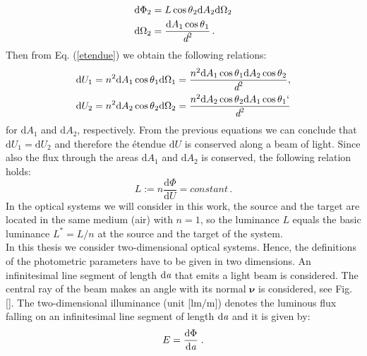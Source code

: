 \begin{equation}\begin{split}
\textrm{d}\Phi_2 &= L \cos\mbox{$\theta$}_2 \textrm{d}A_2 \textrm{d}\Omega_2\\
\textrm{d}\Omega_2 &= \frac{\textrm{d}A_1\cos\mbox{$\theta$}_1}{\textit{d}^2}\,.
\end{split}
\end{equation}
Then from Eq. (\ref{etendue}) we obtain the following relations: \begin{equation}
\begin{split}
\textrm{d}U_1 &= n^2 \textrm{d}A_1\cos\mbox{$\theta$}_1\textrm{d}\Omega_1= \frac{n^2 \textrm{d}A_1\cos\mbox{$\theta$}_1\textrm{d}A_2\cos\mbox{$\theta$}_2}{\textit{d}^2},\\
\textrm{d}U_2 &= n^2 \textrm{d}A_2\cos\mbox{$\theta$}_2\textrm{d}\Omega_2= \frac{ n^2 \textrm{d}A_2\cos\mbox{$\theta$}_2\textrm{d}A_1\cos\mbox{$\theta$}_1	`}{\textit{d}^2}
\end{split}
\end{equation}
for $\textrm{d}A_1$ and $\textrm{d}A_2$, respectively.
From the previous equations we can conclude that $\textrm{d}U_1=\textrm{d}U_2$ and therefore the \'{e}tendue $\textrm{d}U$ is conserved along a beam of light. 
Since also the flux through the areas $\textrm{d}A_1$ and $\textrm{d}A_2$ is conserved, the following relation holds:
\begin{equation}\label{basicluminance}
L := n \frac{\textrm{d}\Phi}{\textrm{d}U} = constant\,.
\end{equation}
 In the optical systems we will consider in this work, the source and the target are located in the same medium (air) with $n=1$, so the luminance $L$ equals the basic luminance $L^* = L/n$ at the source and the target of the system.\\
\indent In this thesis we consider two-dimensional optical systems. 
 Hence, the definitions of the photometric parameters have to be given in two dimensions. An infinitesimal line segment of length $\textrm{d}\textit{a}$ that emits a light beam is considered. The central ray of the beam makes an angle \myangle with its normal $\boldsymbol{\nu}$ is considered, see Fig. \ref{}. 
 The two-dimensional illuminance \big(unit $\big[\textrm{lm}/\textrm{m}\big]$\big) denotes the luminous flux falling on an infinitesimal line segment of length $\textrm{d}\textit{a}$ 
and it is given by:
 \begin{equation}
 E=\frac{\textrm{d}\Phi}{\textrm{d}\textit{a}}\;.
 \end{equation}

